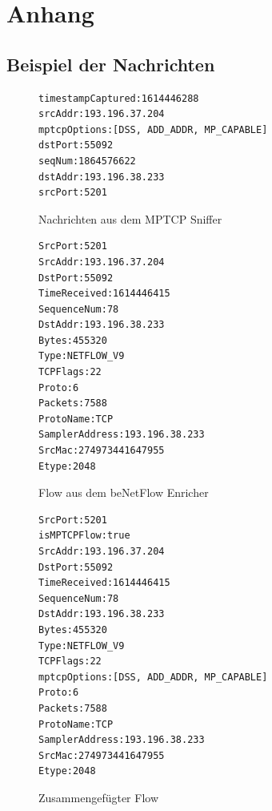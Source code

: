 \documentclass[a4paper, 12pt]{article}
\begin{document}
\newpage




\newpage

\section{Anhang}
\subsection{Beispiel der Nachrichten}

\begin{figure}[H]
\begin{lstlisting}
timestampCaptured:1614446288
srcAddr:193.196.37.204
mptcpOptions:[DSS, ADD_ADDR, MP_CAPABLE]
dstPort:55092
seqNum:1864576622
dstAddr:193.196.38.233
srcPort:5201
\end{lstlisting}
\caption{Nachrichten aus dem MPTCP Sniffer}
\end{figure}

\begin{figure}[H]
\begin{lstlisting}
SrcPort:5201
SrcAddr:193.196.37.204
DstPort:55092
TimeReceived:1614446415
SequenceNum:78
DstAddr:193.196.38.233
Bytes:455320
Type:NETFLOW_V9
TCPFlags:22
Proto:6
Packets:7588
ProtoName:TCP
SamplerAddress:193.196.38.233
SrcMac:274973441647955
Etype:2048
\end{lstlisting}
\caption{Flow aus dem beNetFlow Enricher}
\end{figure}

\begin{figure}[H]
\begin{lstlisting}
SrcPort:5201
isMPTCPFlow:true
SrcAddr:193.196.37.204
DstPort:55092
TimeReceived:1614446415
SequenceNum:78
DstAddr:193.196.38.233
Bytes:455320
Type:NETFLOW_V9
TCPFlags:22
mptcpOptions:[DSS, ADD_ADDR, MP_CAPABLE]
Proto:6
Packets:7588
ProtoName:TCP
SamplerAddress:193.196.38.233
SrcMac:274973441647955
Etype:2048
\end{lstlisting}
\caption{Zusammengefügter Flow}
\end{figure}
\end{document}

